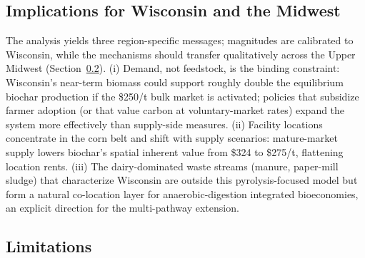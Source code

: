 \subsection{Implications for Wisconsin and the Midwest}

The analysis yields three region-specific messages; magnitudes are calibrated
to Wisconsin, while the mechanisms should transfer qualitatively across the
Upper Midwest (Section~\ref{sec:limitations}). (i) Demand, not feedstock,
is the binding constraint: Wisconsin's near-term biomass could support roughly
double the equilibrium biochar production if the \$250/t bulk market is
activated; policies that subsidize farmer adoption (or that value carbon at
voluntary-market rates) expand the system more effectively than supply-side
measures. (ii) Facility locations concentrate in the corn belt and shift with
supply scenarios: mature-market supply lowers biochar's spatial inherent value
from \$324 to \$275/t, flattening location rents. (iii) The dairy-dominated
waste streams (manure, paper-mill sludge) that characterize Wisconsin are
outside this pyrolysis-focused model but form a natural co-location layer for
anaerobic-digestion integrated bioeconomies, an explicit direction for the
multi-pathway extension.

\subsection{Limitations}
\label{sec:limitations}


